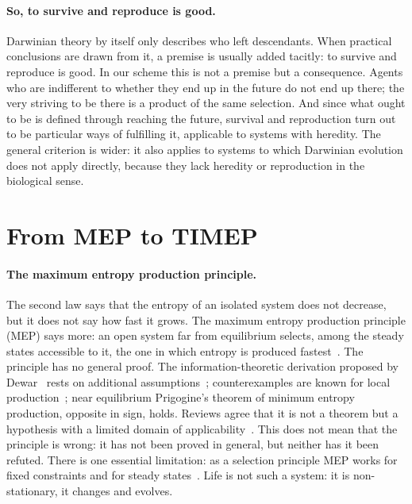 \documentclass[11pt,a4paper]{article}
\begin{document}
\paragraph{So, to survive and reproduce is good.}
Darwinian theory by itself only describes who left descendants. When practical conclusions are drawn from it, a premise is usually added tacitly: to survive and reproduce is good. In our scheme this is not a premise but a consequence. Agents who are indifferent to whether they end up in the future do not end up there; the very striving to be there is a product of the same selection. And since what ought to be is defined through reaching the future, survival and reproduction turn out to be particular ways of fulfilling it, applicable to systems with heredity. The general criterion is wider: it also applies to systems to which Darwinian evolution does not apply directly, because they lack heredity or reproduction in the biological sense.

\section{From MEP to TIMEP}\label{sec:timep}

\paragraph{The maximum entropy production principle.}
The second law says that the entropy of an isolated system does not decrease, but it does not say how fast it grows. The maximum entropy production principle (MEP) says more: an open system far from equilibrium selects, among the steady states accessible to it, the one in which entropy is produced fastest~\cite{martyushev2006,kleidon2010}. The principle has no general proof. The information-theoretic derivation proposed by Dewar~\cite{dewar2003} rests on additional assumptions~\cite{grinstein2007,bruers2007}; counterexamples are known for local production~\cite{ross2012}; near equilibrium Prigogine's theorem of minimum entropy production, opposite in sign, holds. Reviews agree that it is not a theorem but a hypothesis with a limited domain of applicability~\cite{martyushev2021}. This does not mean that the principle is wrong: it has not been proved in general, but neither has it been refuted. There is one essential limitation: as a selection principle MEP works for fixed constraints and for steady states~\cite{canizares2023}. Life is not such a system: it is non-stationary, it changes and evolves.
\end{document}
